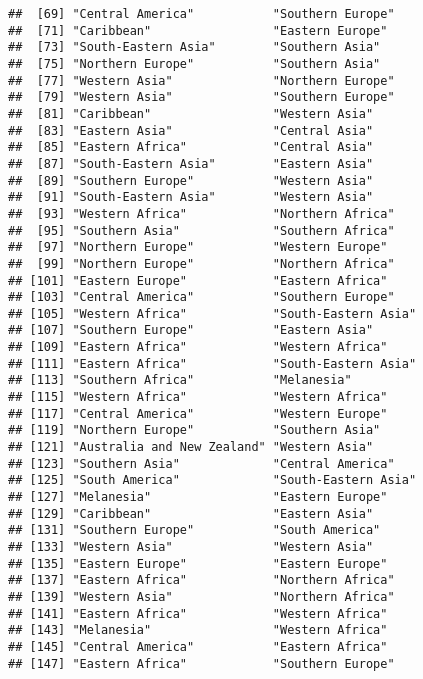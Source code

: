 \documentclass[]{article}
\begin{document}
\begin{verbatim}
##  [69] "Central America"           "Southern Europe"          
##  [71] "Caribbean"                 "Eastern Europe"           
##  [73] "South-Eastern Asia"        "Southern Asia"            
##  [75] "Northern Europe"           "Southern Asia"            
##  [77] "Western Asia"              "Northern Europe"          
##  [79] "Western Asia"              "Southern Europe"          
##  [81] "Caribbean"                 "Western Asia"             
##  [83] "Eastern Asia"              "Central Asia"             
##  [85] "Eastern Africa"            "Central Asia"             
##  [87] "South-Eastern Asia"        "Eastern Asia"             
##  [89] "Southern Europe"           "Western Asia"             
##  [91] "South-Eastern Asia"        "Western Asia"             
##  [93] "Western Africa"            "Northern Africa"          
##  [95] "Southern Asia"             "Southern Africa"          
##  [97] "Northern Europe"           "Western Europe"           
##  [99] "Northern Europe"           "Northern Africa"          
## [101] "Eastern Europe"            "Eastern Africa"           
## [103] "Central America"           "Southern Europe"          
## [105] "Western Africa"            "South-Eastern Asia"       
## [107] "Southern Europe"           "Eastern Asia"             
## [109] "Eastern Africa"            "Western Africa"           
## [111] "Eastern Africa"            "South-Eastern Asia"       
## [113] "Southern Africa"           "Melanesia"                
## [115] "Western Africa"            "Western Africa"           
## [117] "Central America"           "Western Europe"           
## [119] "Northern Europe"           "Southern Asia"            
## [121] "Australia and New Zealand" "Western Asia"             
## [123] "Southern Asia"             "Central America"          
## [125] "South America"             "South-Eastern Asia"       
## [127] "Melanesia"                 "Eastern Europe"           
## [129] "Caribbean"                 "Eastern Asia"             
## [131] "Southern Europe"           "South America"            
## [133] "Western Asia"              "Western Asia"             
## [135] "Eastern Europe"            "Eastern Europe"           
## [137] "Eastern Africa"            "Northern Africa"          
## [139] "Western Asia"              "Northern Africa"          
## [141] "Eastern Africa"            "Western Africa"           
## [143] "Melanesia"                 "Western Africa"           
## [145] "Central America"           "Eastern Africa"           
## [147] "Eastern Africa"            "Southern Europe"          

\end{verbatim}
\end{document}
